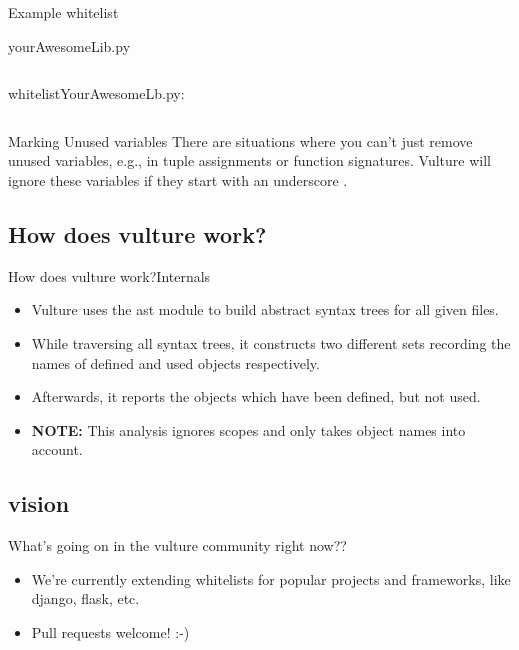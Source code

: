 \documentclass{beamer}
\begin{document}
\begin{frame}{Example whitelist}
    \begin{block}{yourAwesomeLib.py}
        \inputminted{python}{yourAwesomeLib.py}
    \end{block}
    \begin{block}{whitelistYourAwesomeLb.py:}
        \inputminted{python}{whitelistYourAwesomeLib.py}
    \end{block}
\end{frame}

\begin{frame}{Marking Unused variables}
    There are situations where you can't just remove unused variables, e.g., in tuple assignments or function signatures. Vulture will ignore these variables if they start with an underscore .   
\end{frame}

\subsection{How does vulture work?}

\begin{frame}{How does vulture work?}{Internals}
\begin{itemize}
    \item
        Vulture uses the ast module to build abstract syntax trees for all given files.
    \pause
    \item
        While traversing all syntax trees, it constructs two different sets recording the names of defined and used objects respectively.
    \pause
    \item
        Afterwards, it reports the objects which have been defined, but not used.
    \pause
    \item
        \textbf{NOTE:} This analysis ignores scopes and only takes object names into account.
\end{itemize}
\end{frame}

\subsection*{vision}
\begin{frame}{What's going on in the vulture community right now??}
    \begin{itemize}
        \item
            We're currently extending whitelists for popular projects and frameworks, like django, flask, etc.
        \item
            Pull requests welcome! :-)
    \end{itemize}
\end{frame}
\end{document}
